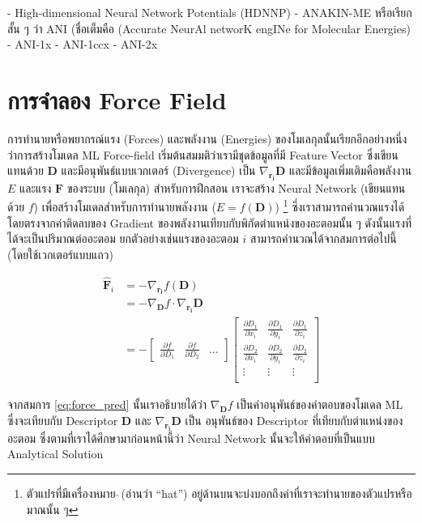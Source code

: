 - High-dimensional Neural Network Potentials (HDNNP)\cite{behler2007}
- ANAKIN-ME หรือเรียกสั้น ๆ ว่า ANI (ชื่อเต็มคือ (Accurate NeurAl networK engINe for Molecular Energies)
    - ANI-1x\cite{smith2017}
    - ANI-1ccx\cite{smith2018}
    - ANI-2x\cite{smith2019}

\section{การจำลอง Force Field}

การทำนายหรือพยากรณ์แรง (Forces) และพลังงาน (Energies) ของโมเลกุลนั้นเรียกอีกอย่างหนึ่งว่าการสร้างโมเดล ML Force-field 
เริ่มต้นสมมติว่าเรามีชุดข้อมูลที่มี Feature Vector ซึ่งเขียนแทนด้วย $\mathbf{D}$ และมีอนุพันธ์แบบเวกเตอร์ (Divergence) เป็น 
$\nabla_{\mathbf{r_i}} \mathbf{D}$ และมีข้อมูลเพิ่มเติมคือพลังงาน $E$ และแรง $\mathbf{F}$ ของระบบ (โมเลกุล) สำหรับการฝึกสอน
เราจะสร้าง Neural Network (เขียนแทนด้วย $f$) เพื่อสร้างโมเดลสำหรับการทำนายพลังงาน ($\hat{E} = f(\mathbf{D})$)
\footnote{ตัวแปรที่มีเครื่องหมาย $\hat{}$\,(อ่านว่า \enquote{hat}) อยู่ด้านบนจะบ่งบอกถึงค่าที่เราจะทำนายของตัวแปรหรือมาณนั้น ๆ}
ซึ่งเราสามารถคำนวณแรงได้โดยตรงจากค่าติดลบของ Gradient ของพลังงานเทียบกับพิกัดตำแหน่งของอะตอมนั้น ๆ ดังนั้นแรงที่ได้จะเป็นปริมาณต่ออะตอม
ยกตัวอย่างเช่นแรงของอะตอม $i$ สามารถคำนวณได้จากสมการต่อไปนี้ (โดยใช้เวกเตอร์แบบแถว)

\begin{align}\label{eq:force_pred}
\hat{\mathbf{F}}_i &= - \nabla_{\mathbf{r_i}} f(\mathbf{D}) \\
&= - \nabla_{\mathbf{D}} f \cdot \nabla_{\mathbf{r_i}} \mathbf{D}\\
&= - \begin{bmatrix}
    \frac{\partial f}{\partial D_1} & \frac{\partial f}{\partial D_2} & \dots
\end{bmatrix}
\begin{bmatrix}
    \frac{\partial D_1}{\partial x_i} & \frac{\partial D_1}{\partial y_i} & \frac{\partial D_1}{\partial z_i}\\
    \frac{\partial D_2}{\partial x_i} & \frac{\partial D_2}{\partial y_i} & \frac{\partial D_2}{\partial z_i}\\
    \vdots & \vdots & \vdots \\
\end{bmatrix}
\end{align}

จากสมการ \ref{eq:force_pred} นั้นเราอธิบายได้ว่า $\nabla_{\mathbf{D}} f$ เป็นค่าอนุพันธ์ของคำตอบของโมเดล ML ซึ่งจะเทียบกับ%
Descriptor $\mathbf{D}$ และ $\nabla_{\mathbf{r_i}} \mathbf{D}$ เป็น อนุพันธ์ของ Descriptor ที่เทียบกับตำแหน่งของอะตอม
ซึ่งตามที่เราได้ศึกษามาก่อนหน้านี้ว่า Neural Network นั้นจะให้คำตอบที่เป็นแบบ Analytical Solution

